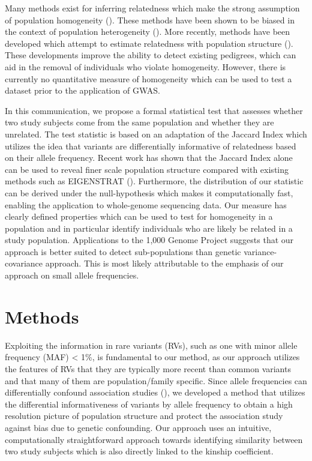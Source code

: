 Many methods exist for inferring relatedness which make the strong
assumption of population homogeneity (\citealp{purcell2007plink,yang2010common,kang2010variance,choi2009case}).
These methods have been shown to be biased in the context of population
heterogeneity (\citealp{manichaikul2010robust}). More recently, methods
have been developed which attempt to estimate relatedness
with population structure (\citealp{thornton2012estimating,manichaikul2010robust}).
These developments improve the ability to detect existing pedigrees,
which can aid in the removal of individuals who violate homogeneity.
However, there is currently no quantitative measure of homogeneity
which can be used to test a dataset prior to the application of GWAS.

In this communication, we propose a formal statistical test that assesses
whether two study subjects come from the same population and whether
they are unrelated. The test statistic is based on an adaptation of
the Jaccard Index which utilizes the idea that variants are differentially
informative of relatedness based on their allele frequency. Recent
work has shown that the Jaccard Index alone can be used to reveal
finer scale population structure compared with existing methods such
as EIGENSTRAT (\citealp{prokopenko2016utilizing}). Furthermore, the distribution
of our statistic can be derived under the null-hypothesis which makes
it computationally fast, enabling the application to whole-genome
sequencing data. Our measure has clearly defined properties which
can be used to test for homogeneity in a population and in particular
identify individuals who are likely be related in a study population.
Applications to the 1,000 Genome Project suggests that our approach
is better suited to detect sub-populations than genetic variance-covariance
approach. This is most likely attributable to the emphasis of our
approach on small allele frequencies.


\section{Methods}

Exploiting the information in rare variants (RVs), such as one with
minor allele frequency (MAF) < 1\%, is fundamental to our method,
as our approach utilizes the features of RVs that they are typically
more recent than common variants and that many of them are population/family
specific. Since allele frequencies can differentially confound association
studies (\citealp{mathieson2012differential}), we developed a method that
utilizes the differential informativeness of variants by allele frequency
to obtain a high resolution picture of population structure and protect
the association study against bias due to genetic confounding. Our
approach uses an intuitive, computationally straightforward approach
towards identifying similarity between two study subjects which is
also directly linked to the kinship coefficient. 

